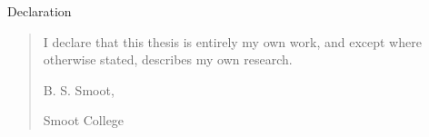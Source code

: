 \newpage{}
  \thispagestyle{empty}
  \begin{center}
  \vspace*{1.5cm}
  {\LARGE Declaration }
  \end{center}
  \vspace{0.5cm}
  \begin{verse}
  \begin{center} 
I declare that this thesis is entirely my own work, and except where otherwise stated, describes
my own research.
\par

  \vspace{2.5cm}

B. S. Smoot,
\par
Smoot College
  \end{center}\end{verse}

